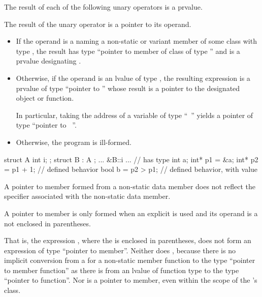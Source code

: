\pnum
The result of each of the following unary operators is a prvalue.

\pnum
{}%
%
The result of the unary \tcode{\&} operator is a pointer to its operand.
\begin{itemize}
\item
If the operand is a  naming a non-static or variant member 
of some class  with type , the result has type ``pointer to member
of class  of type '' and is a prvalue designating .
\item
Otherwise, if the operand is an lvalue of type ,
the resulting expression is a prvalue of type ``pointer to ''
whose result is a pointer to the designated object or function.
\begin{note}
In particular, taking the address of a variable of type ``\cv{}~''
yields a pointer of type ``pointer to \cv{}~''.
\end{note}
\item
Otherwise, the program is ill-formed.
\end{itemize}
\begin{example}
\begin{codeblock}
struct A { int i; };
struct B : A { };
... &B::i ...       // has type 
int a;
int* p1 = &a;
int* p2 = p1 + 1;   // defined behavior
bool b = p2 > p1;   // defined behavior, with value 
\end{codeblock}
\end{example}
\begin{note}
A pointer to member formed from a  non-static data
member does not reflect the  specifier
associated with the non-static data member.
\end{note}

\pnum
A pointer to member is only formed when an explicit \tcode{\&} is used
and its operand is a  not enclosed in
parentheses.
\begin{note}
That is, the expression , where the
 is enclosed in parentheses, does not form an
expression of type ``pointer to member''. Neither does
, because there is no implicit conversion from a
 for a non-static member function to the type
``pointer to member function'' as there is from an lvalue of function
type to the type ``pointer to function''. Nor is
 a pointer to member, even within the scope of
the 's class.
\end{note}

